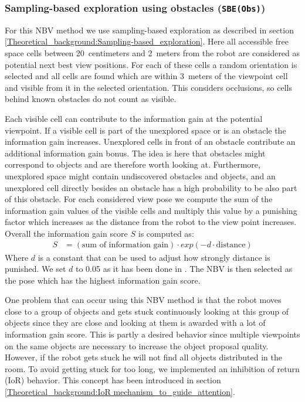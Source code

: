 \documentclass[a4paper,11pt,english]{article}
\begin{document}
\subsubsection{Sampling-based exploration using obstacles (\texttt{SBE(Obs)})}
For this NBV method we use sampling-based exploration as described in section \ref{Theoretical_background:Sampling-based_exploration}.
Here all accessible free space cells between \num{20}~centimeters and \num{2}~meters from the robot are considered as potential next best view positions.
For each of these cells a random orientation is selected and all cells are found which are within \num{3}~meters of the viewpoint cell and visible from it in the selected orientation.
This considers occlusions, so cells behind known obstacles do not count as visible.

Each visible cell can contribute to the information gain at the potential viewpoint.
If a visible cell is part of the unexplored space or is an obstacle the information gain increases. Unexplored cells in front of an obstacle contribute an additional information gain bonus.
The idea is here that obstacles might correspond to objects and are therefore worth looking at.
Furthermore, unexplored space might contain undiscovered obstacles and objects, and an unexplored cell directly besides an obstacle has a high probability to be also part of this obstacle.
For each considered view pose we compute the sum of the information gain values of the visible cells and multiply this value by a punishing factor which increases as the distance from the robot to the view point increases.
Overall the information gain score $S$ is computed as:
\begin{align*}
 S &= (\mbox{sum of information gain})\cdot exp(-d\cdot \mbox{distance})
\end{align*}
Where $d$ is a constant that can be used to adjust how strongly distance is punished. We set $d$ to \num{0.05} as it has been done in \cite{surmann2003autonomous}.
The NBV is then selected as the pose which has the highest information gain score.

One problem that can occur using this NBV method is that the robot moves close to a group of objects and gets stuck continuously looking at this group of objects since they are close and looking at them is awarded with a lot of information gain score.
This is partly a desired behavior since multiple viewpoints on the same objects are necessary to increase the object proposal quality.
However, if the robot gets stuck he will not find all objects distributed in the room.
To avoid getting stuck for too long, we implemented an inhibition of return (IoR) behavior.
This concept has been introduced in section \ref{Theoretical_background:IoR mechanism_to_guide_attention}.
\end{document}
